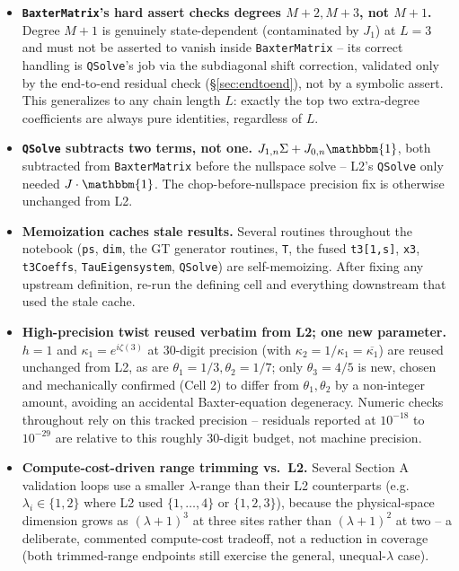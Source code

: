 \documentclass[11pt]{article}
\begin{document}
\begin{itemize}
  the explicit multiplicity check as the sole source of truth for which $n$ actually exist per
  sector.
\item \textbf{\texttt{BaxterMatrix}'s hard assert checks degrees $M{+}2,M{+}3$, not $M{+}1$.} Degree
  $M{+}1$ is genuinely state-dependent (contaminated by $J_1$) at $L=3$ and must not be asserted to
  vanish inside \texttt{BaxterMatrix} -- its correct handling is \texttt{QSolve}'s job via the
  subdiagonal shift correction, validated only by the end-to-end residual check
  (\S\ref{sec:endtoend}), not by a symbolic assert. This generalizes to any chain length $L$: exactly
  the top two extra-degree coefficients are always pure identities, regardless of $L$.
\item \textbf{\texttt{QSolve} subtracts two terms, not one.} $J_{1,n}\Sigma + J_{0,n}\mathbbm{1}$,
  both subtracted from \texttt{BaxterMatrix} before the nullspace solve -- L2's \texttt{QSolve} only
  needed $J\cdot\mathbbm{1}$. The chop-before-nullspace precision fix is otherwise unchanged from L2.
\item \textbf{Memoization caches stale results.} Several routines throughout the notebook
  (\texttt{ps}, \texttt{dim}, the GT generator routines, \texttt{T}, the fused \texttt{t3[1,s]},
  \texttt{x3}, \texttt{t3Coeffs}, \texttt{TauEigensystem}, \texttt{QSolve}) are self-memoizing. After
  fixing any upstream definition, re-run the defining cell and everything downstream that used the
  stale cache.
\item \textbf{High-precision twist reused verbatim from L2; one new parameter.} $h=1$ and
  $\kappa_1=e^{i\zeta(3)}$ at 30-digit precision (with $\kappa_2=1/\kappa_1=\overline{\kappa_1}$) are
  reused unchanged from L2, as are $\theta_1=1/3,\theta_2=1/7$; only $\theta_3=4/5$ is new, chosen
  and mechanically confirmed (Cell 2) to differ from $\theta_1,\theta_2$ by a non-integer amount,
  avoiding an accidental Baxter-equation degeneracy. Numeric checks throughout rely on this tracked
  precision -- residuals reported at $10^{-18}$ to $10^{-29}$ are relative to this roughly 30-digit
  budget, not machine precision.
\item \textbf{Compute-cost-driven range trimming vs.\ L2.} Several Section A validation loops use a
  smaller $\lambda$-range than their L2 counterparts (e.g.\ $\lambda_i\in\{1,2\}$ where L2 used
  $\{1,\dots,4\}$ or $\{1,2,3\}$), because the physical-space dimension grows as $(\lambda+1)^3$ at
  three sites rather than $(\lambda+1)^2$ at two -- a deliberate, commented compute-cost tradeoff, not
  a reduction in coverage (both trimmed-range endpoints still exercise the general, unequal-$\lambda$
  case).
\end{itemize}
\end{document}
